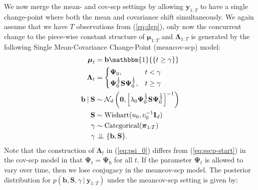 \documentclass{article}
\newcommand\indep{\perp\!\!\!\perp}
\begin{document}
We now merge the mean- and cov-scp settings by allowing $\mathbf{y}_{1:T}$ to have a single change-point where both the mean and covariance shift simultaneously. We again assume that we have $T$ observations from (\ref{eq:dgp}), only now the concurrent change to the piece-wise constant structure of $\boldsymbol{\mu}_{1:T}$ and $\boldsymbol{\Lambda}_{1:T}$ is generated by the following Single Mean-Covariance Change-Point (meancov-scp) model:
\begin{align}
    \label{eq:smscp-start}
    \boldsymbol{\mu}_t &= \mathbf{b}\mathbbm{1}{\left\{t\geq \gamma \right\}} \\
    \boldsymbol{\Lambda}_t &= 
    \begin{cases}
        \boldsymbol{\Psi}_{0}, & t < \gamma  \\
        \boldsymbol{\Psi}^\frac{1} {2}_{0}\mathbf{S}\boldsymbol{\Psi}^\frac{1}{2}_{0}, & t \geq \gamma
    \end{cases} \label{eq:psi_0}
    \\
    \mathbf{b} \:|\: \mathbf{S} &\sim \mathcal{N}_d\left(\mathbf{0},\left[\lambda_0\boldsymbol{\Psi}^\frac{1}{2}_{0}\mathbf{S}\boldsymbol{\Psi}^\frac{1}{2}_{0}\right]^{-1}\right) \\
    \mathbf{S} &\sim \text{Wishart}(u_0, v_0^{-1}\mathbf{I}_d) \\    
    \gamma &\sim \text{Categorical}(\boldsymbol{\pi}_{1:T}) \\
    \gamma &\indep \{\mathbf{b},\mathbf{S}\}. 
    \label{eq:smscp-end}
\end{align}
Note that the construction of $\boldsymbol{\Lambda}_t$ in (\ref{eq:psi_0}) differs from (\ref{eq:sscp-start}) in the cov-scp model in that $\boldsymbol{\Psi}_t = \boldsymbol{\Psi}_0$ for all $t$. If the parameter $\boldsymbol{\Psi}_t$ is allowed to vary over time, then we lose conjugacy in the meancov-scp model. The posterior distribution for $p(\mathbf{b}, \mathbf{S}, \gamma \:|\: \mathbf{y}_{1:T})$ under the meancov-scp setting is given by:
\end{document}
